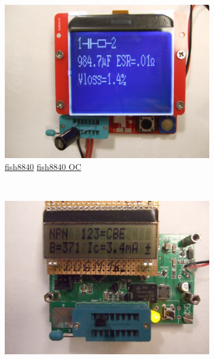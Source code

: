 \documentclass[pdftex,12pt,a4paper,english]{article}
\begin{document}
\begin{figure}[H]
  \begin{subfigure}[b]{.3\textwidth}
    \centering
    \includegraphics[width=1.\textwidth]{../PNG/m328_fish8840.JPG}
	  \\ \vspace{-0.5em}
	  {\href{run:./trunk/mega328_fish8840/.}{fish8840}} \hspace{10pt}
	  {\href{run:./trunk/mega328_fish8840_OC/.}{fish8840 OC}}
  \end{subfigure}
~
  \begin{subfigure}[b]{.3\textwidth}	%
    \centering
    \includegraphics[width=1.\textwidth]{../PNG/m328_dogm.JPG}
	  \\ \vspace{-0.5em}

\end{subfigure}
\end{figure}
\end{document}
